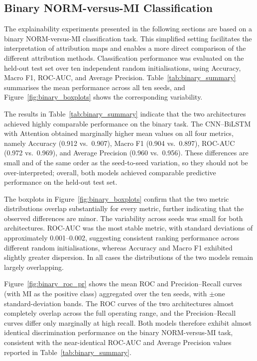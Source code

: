 
\subsection{Binary NORM-versus-MI Classification}
\label{sec:binary_results}

The explainability experiments presented in the following sections are based on a binary
NORM-versus-MI classification task. This simplified setting facilitates the interpretation
of attribution maps and enables a more direct comparison of the different attribution
methods. Classification performance was evaluated on the held-out test set over ten
independent random initialisations, using Accuracy, Macro F1, ROC-AUC, and Average
Precision. Table~\ref{tab:binary_summary} summarises the mean performance across all ten
seeds, and Figure~\ref{fig:binary_boxplots} shows the corresponding variability.

The results in Table~\ref{tab:binary_summary} indicate that the two architectures achieved
highly comparable performance on the binary task. The CNN--BiLSTM with Attention obtained
marginally higher mean values on all four metrics, namely Accuracy (0.912 vs.\ 0.907),
Macro F1 (0.904 vs.\ 0.897), ROC-AUC (0.972 vs.\ 0.969), and Average Precision
(0.960 vs.\ 0.956). These differences are small and of the same order as the seed-to-seed
variation, so they should not be over-interpreted; overall, both models achieved comparable
predictive performance on the held-out test set.

The boxplots in Figure~\ref{fig:binary_boxplots} confirm that the two metric distributions
overlap substantially for every metric, further indicating that the observed differences are
minor. The variability across seeds was small for both architectures. ROC-AUC was the most
stable metric, with standard deviations of approximately 0.001--0.002, suggesting consistent
ranking performance across different random initialisations, whereas Accuracy and Macro F1
exhibited slightly greater dispersion. In all cases the distributions of the two models
remain largely overlapping.

Figure~\ref{fig:binary_roc_pr} shows the mean ROC and Precision--Recall curves (with MI as
the positive class) aggregated over the ten seeds, with $\pm$one standard-deviation bands.
The ROC curves of the two architectures almost completely overlap across the full operating
range, and the Precision--Recall curves differ only marginally at high recall. Both models
therefore exhibit almost identical discrimination performance on the binary NORM-versus-MI
task, consistent with the near-identical ROC-AUC and Average Precision values reported in
Table~\ref{tab:binary_summary}.

